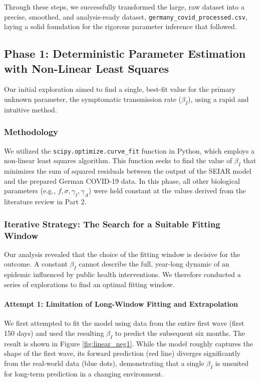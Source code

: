 \documentclass[12pt, a4paper]{article}
\begin{document}
Through these steps, we successfully transformed the large, raw dataset into a precise, smoothed, and analysis-ready dataset, \texttt{germany\_covid\_processed.csv}, laying a solid foundation for the rigorous parameter inference that followed.

\subsection{Phase 1: Deterministic Parameter Estimation with Non-Linear Least Squares}
Our initial exploration aimed to find a single, best-fit value for the primary unknown parameter, the symptomatic transmission rate ($\beta_I$), using a rapid and intuitive method.

\subsubsection{Methodology}
We utilized the \texttt{scipy.optimize.curve\_fit} function in Python, which employs a non-linear least squares algorithm. This function seeks to find the value of $\beta_I$ that minimizes the sum of squared residuals between the output of the SEIAR model and the prepared German COVID-19 data. In this phase, all other biological parameters (e.g., $f, \sigma, \gamma_I, \gamma_A$) were held constant at the values derived from the literature review in Part 2.

\subsubsection{Iterative Strategy: The Search for a Suitable Fitting Window}
Our analysis revealed that the choice of the fitting window is decisive for the outcome. A constant $\beta_I$ cannot describe the full, year-long dynamic of an epidemic influenced by public health interventions. We therefore conducted a series of explorations to find an optimal fitting window.

\paragraph{Attempt 1: Limitation of Long-Window Fitting and Extrapolation}
We first attempted to fit the model using data from the entire first wave (first 150 days) and used the resulting $\beta_I$ to predict the subsequent six months. The result is shown in Figure \ref{fig:linear_neg1}. While the model roughly captures the shape of the first wave, its forward prediction (red line) diverges significantly from the real-world data (blue dots), demonstrating that a single $\beta_I$ is unsuited for long-term prediction in a changing environment.
\end{document}
